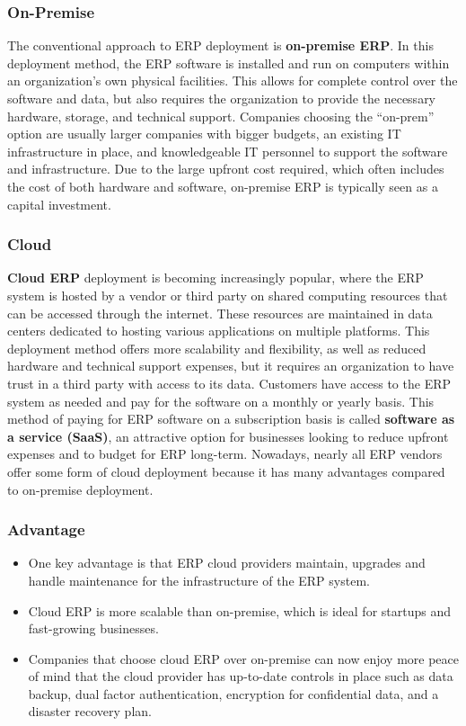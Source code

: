 \subsubsection{On-Premise}
The conventional approach to ERP deployment is \textbf{on-premise ERP}.
In this deployment method, the ERP software is installed and run on computers within an organization's own physical facilities. This allows for complete control over the software and data, but also requires the organization to provide the necessary hardware, storage, and technical support. Companies choosing the “on-prem” option are usually larger companies with bigger budgets, an existing IT infrastructure in place, and knowledgeable IT personnel to support the software and infrastructure. Due to the large upfront cost required, which often includes the cost of both hardware and software, on-premise ERP is typically seen as a capital investment.

\subsubsection{Cloud}
\textbf{Cloud ERP} deployment is becoming increasingly popular, where the ERP system is hosted by a vendor or third party on shared computing resources that can be accessed through the internet. These resources are maintained in data centers dedicated to hosting various applications on multiple platforms.
This deployment method offers more scalability and flexibility, as well as reduced hardware and technical support expenses, but it requires an organization to have trust in a third party with access to its data.
Customers have access to the ERP system as needed and pay for the software on a monthly or yearly basis. This method of paying for ERP software on a subscription basis is called \textbf{software as a service (SaaS)}, an attractive option for businesses looking to reduce upfront expenses and to budget for ERP long-term.
Nowadays, nearly all ERP vendors offer some form of cloud deployment because it has many advantages compared to on-premise deployment.

\subsubsection{Advantage}
\begin{itemize}
    \item One key advantage is that ERP cloud providers maintain, upgrades and handle maintenance for the infrastructure of the ERP system.
    \item Cloud ERP is more scalable than on-premise, which is ideal for startups and fast-growing businesses.
    \item Companies that choose cloud ERP over on-premise can now enjoy more peace of mind that the cloud provider has up-to-date controls in place such as data backup, dual factor authentication, encryption for confidential data, and a disaster recovery plan.
\end{itemize}

